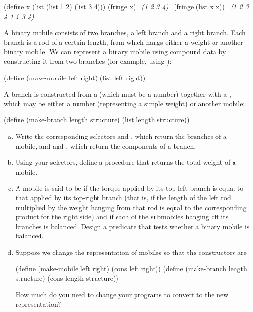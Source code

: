 \begin{exerciseGroup}
\begin{codeBlock}
(define x (list (list 1 2) (list 3 4)))
(fringe x)
~\textit{(1 2 3 4)}~
(fringe (list x x))
~\textit{(1 2 3 4 1 2 3 4)}~
\end{codeBlock}

\label{Exercise 2.29}
 A binary mobile consists of two
branches, a left branch and a right branch.  Each branch is a rod of a certain
length, from which hangs either a weight or another binary mobile.  We can
represent a binary mobile using compound data by constructing it from two
branches (for example, using ):

\begin{codeBlock}
(define (make-mobile left right)
  (list left right))
\end{codeBlock}

A branch is constructed from a  (which must be a number) together
with a , which may be either a number (representing a simple
weight) or another mobile:

\begin{codeBlock}
(define (make-branch length structure)
  (list length structure))
\end{codeBlock}

\begin{enumerate}[a.]

\item
Write the corresponding selectors  and ,
which return the branches of a mobile, and  and
, which return the components of a branch.

\item
Using your selectors, define a procedure  that returns the
total weight of a mobile.

\item
A mobile is said to be  if the torque applied by its top-left
branch is equal to that applied by its top-right branch (that is, if the length
of the left rod multiplied by the weight hanging from that rod is equal to the
corresponding product for the right side) and if each of the submobiles hanging
off its branches is balanced. Design a predicate that tests whether a binary
mobile is balanced.

\item
Suppose we change the representation of mobiles so that the constructors are

\begin{codeBlock}
(define (make-mobile left right) (cons left right))
(define (make-branch length structure)
  (cons length structure))
\end{codeBlock}

How much do you need to change your programs to convert to the new
representation?

\end{enumerate}
\end{exerciseGroup}

